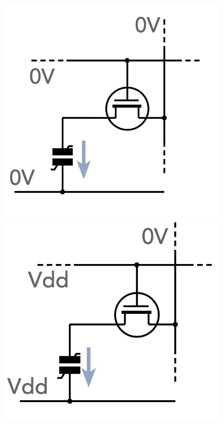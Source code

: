 \documentclass[a4paper]{article}
\begin{document}
\begin{figure}[H]
\begin{center}
\begin{minipage}[h]{0.32\linewidth}
\includegraphics[width=0.9\linewidth]{p11.png}
\caption{} 
\label{p11} 
\end{minipage}
\hfill 
\begin{minipage}[h]{0.32\linewidth}
\includegraphics[width=0.9\linewidth]{p12.png}
\caption{}
\label{p12}
\end{minipage}

\end{center}
\end{figure}
\end{document}
